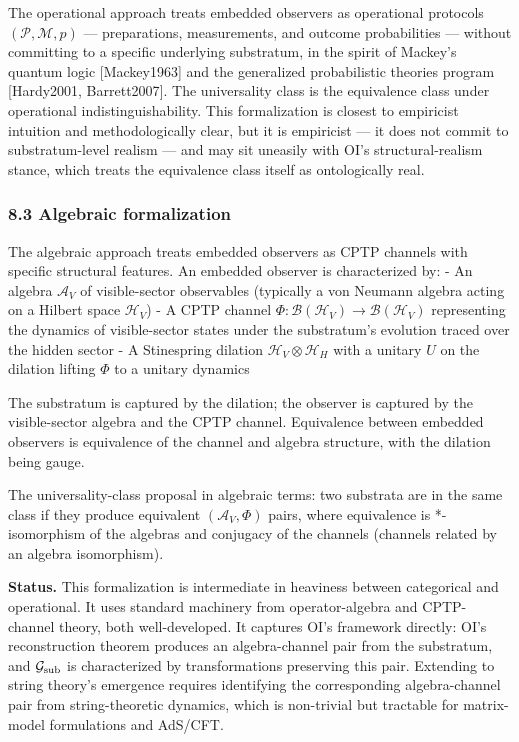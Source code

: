 \documentclass[
]{article}
\begin{document}
The operational approach treats embedded observers as operational
protocols \((\mathcal{P}, \mathcal{M}, p)\) --- preparations,
measurements, and outcome probabilities --- without committing to a
specific underlying substratum, in the spirit of Mackey's quantum logic
{[}Mackey1963{]} and the generalized probabilistic theories program
{[}Hardy2001, Barrett2007{]}. The universality class is the equivalence
class under operational indistinguishability. This formalization is
closest to empiricist intuition and methodologically clear, but it is
empiricist --- it does not commit to substratum-level realism --- and
may sit uneasily with OI's structural-realism stance, which treats the
equivalence class itself as ontologically real.

\hypertarget{algebraic-formalization}{%
\subsubsection{8.3 Algebraic
formalization}\label{algebraic-formalization}}

The algebraic approach treats embedded observers as CPTP channels with
specific structural features. An embedded observer is characterized by:
- An algebra \(\mathcal{A}_V\) of visible-sector observables (typically
a von Neumann algebra acting on a Hilbert space \(\mathcal{H}_V\)) - A
CPTP channel
\(\Phi: \mathcal{B}(\mathcal{H}_V) \to \mathcal{B}(\mathcal{H}_V)\)
representing the dynamics of visible-sector states under the
substratum's evolution traced over the hidden sector - A Stinespring
dilation \(\mathcal{H}_V \otimes \mathcal{H}_H\) with a unitary \(U\) on
the dilation lifting \(\Phi\) to a unitary dynamics

The substratum is captured by the dilation; the observer is captured by
the visible-sector algebra and the CPTP channel. Equivalence between
embedded observers is equivalence of the channel and algebra structure,
with the dilation being gauge.

The universality-class proposal in algebraic terms: two substrata are in
the same class if they produce equivalent \((\mathcal{A}_V, \Phi)\)
pairs, where equivalence is *-isomorphism of the algebras and conjugacy
of the channels (channels related by an algebra isomorphism).

\textbf{Status.} This formalization is intermediate in heaviness between
categorical and operational. It uses standard machinery from
operator-algebra and CPTP-channel theory, both well-developed. It
captures OI's framework directly: OI's reconstruction theorem produces
an algebra-channel pair from the substratum, and
\(\mathcal{G}_{\rm sub}\) is characterized by transformations preserving
this pair. Extending to string theory's emergence requires identifying
the corresponding algebra-channel pair from string-theoretic dynamics,
which is non-trivial but tractable for matrix-model formulations and
AdS/CFT.
\end{document}
